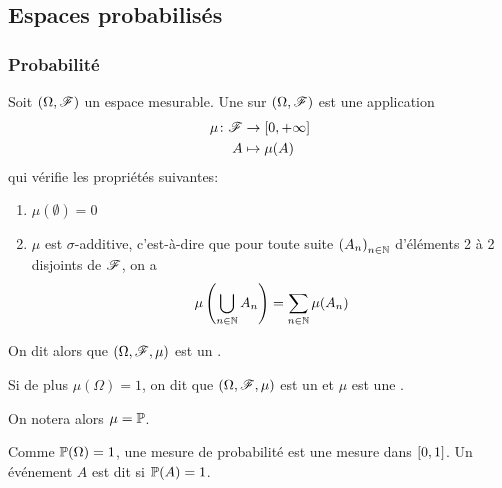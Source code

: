\subsection{Espaces probabilisés}\label{subsec:1}


\subsubsection{Probabilité}\label{subsubsec:1-1}
\setcounter{subsection}{0}
\begin{definition}
    Soit \((\Omega, \mathscr{F})\) un espace mesurable. Une
     sur \((\Omega, \mathscr{F})\) est une application
    \begin{equation*}
        \begin{aligned}
            \mu\colon \mathscr{F} &\to \mathopen{}\left[0,+\infty\right]\mathclose{}\\
            A &\mapsto \mu(A)
        \end{aligned}
    \end{equation*}
    qui vérifie les propriétés suivantes:
    \begin{enumerate}
        \item \(\mu(\emptyset) = 0\)
        \item \(\mu\) est \(\sigma\)-additive, c'est-à-dire que pour
        toute suite \({(A_n)}_{n\in\mathbb{N}}\) d'éléments 2 à 2
        disjoints de \(\mathscr{F}\), on a
        \begin{equation*}
            \mu\left(\bigcup_{n\in\mathbb{N}}A_n\right) = \sum_{n\in\mathbb{N}}\mu(A_n)
        \end{equation*}
    \end{enumerate}

    On dit alors que \((\Omega, \mathscr{F},\mu)\) est un .

    Si de plus \(\mu(\Omega) = 1\), on dit que \((\Omega, \mathscr{F},\mu)\)
    est un  et \(\mu\) est une .

    On notera alors \(\mu = \mathbb{P}\).
\end{definition}

\begin{remark}
    Comme \(\mathbb{P}(\Omega)=1\), une mesure de probabilité est une mesure
    dans \(\mathopen{}\left[0,1\right]\mathclose{}\). Un événement \(A\) est dit 
    si \(\mathbb{P}(A) = 1\).
\end{remark}

